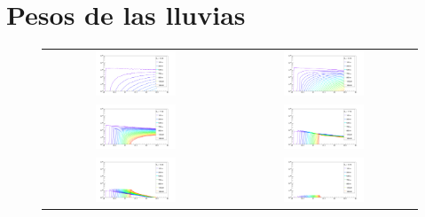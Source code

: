 \section{Pesos de las lluvias}

	\begin{figure}[ht!]
		\centering
		\begin{tabular}{cc}
		\includegraphics[width=0.45\textwidth]{fig/resultadosRadio/weights16_25.png} &
		\includegraphics[width=0.45\textwidth]{fig/resultadosRadio/weights16_75.png} \\
		\includegraphics[width=0.45\textwidth]{fig/resultadosRadio/weights17_25.png} &
		\includegraphics[width=0.45\textwidth]{fig/resultadosRadio/weights17_75.png} \\
		\includegraphics[width=0.45\textwidth]{fig/resultadosRadio/weights18_25.png} &
		\includegraphics[width=0.45\textwidth]{fig/resultadosRadio/weights18_75.png} \\
		\end{tabular}


\end{figure}
